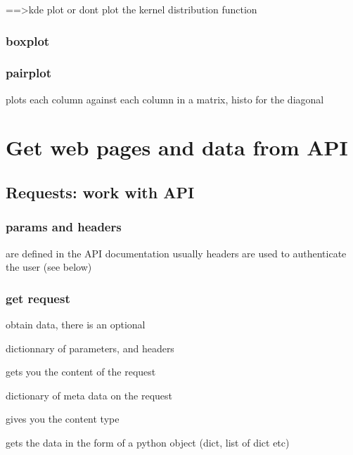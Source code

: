 

			==>kde plot or dont plot the kernel distribution function

		\subsubsection{boxplot}

		\subsubsection{pairplot}
			plots each column against each column in a matrix, histo for the diagonal



\section{Get web pages and data from API}

	\subsection{Requests: work with API}

		\subsubsection{params and headers}
			are defined in the API documentation
			usually headers are used to authenticate the user (see below)

		\subsubsection{get request}

			 obtain data, there is an optional 

			dictionnary of parameters, and headers

			 gets you the content of the request

			 dictionary of meta data on the request

			 gives you the content type

			 gets the data in the form of a python object (dict, list of dict etc)

